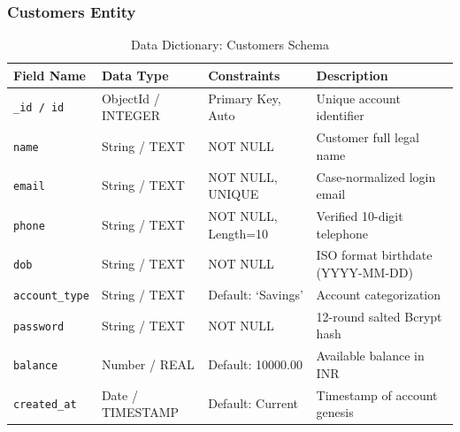 \subsubsection{Customers Entity}
\begin{table}[htbp]
\centering
\caption{Data Dictionary: Customers Schema}
\label{tab:dict_customers}
\begin{tabular}{@{}llll@{}}
\toprule
\textbf{Field Name} & \textbf{Data Type} & \textbf{Constraints} & \textbf{Description} \\ \midrule
\texttt{\_id / id} & ObjectId / INTEGER & Primary Key, Auto & Unique account identifier \\
\texttt{name} & String / TEXT & NOT NULL & Customer full legal name \\
\texttt{email} & String / TEXT & NOT NULL, UNIQUE & Case-normalized login email \\
\texttt{phone} & String / TEXT & NOT NULL, Length=10 & Verified 10-digit telephone \\
\texttt{dob} & String / TEXT & NOT NULL & ISO format birthdate (YYYY-MM-DD) \\
\texttt{account\_type} & String / TEXT & Default: `Savings' & Account categorization \\
\texttt{password} & String / TEXT & NOT NULL & 12-round salted Bcrypt hash \\
\texttt{balance} & Number / REAL & Default: 10000.00 & Available balance in INR \\
\texttt{created\_at} & Date / TIMESTAMP & Default: Current & Timestamp of account genesis \\ \bottomrule
\end{tabular}
\end{table}

